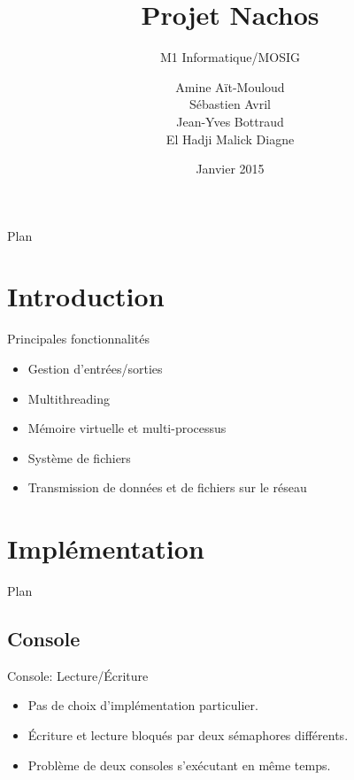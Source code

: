 \documentclass{beamer}
\title{Projet Nachos}
\subtitle{M1 Informatique/MOSIG}
\author{Amine Aït-Mouloud
\\ Sébastien Avril
\\ Jean-Yves Bottraud
\\ El Hadji Malick Diagne
}
\date{Janvier 2015}
\begin{document}

\begin{frame}{Plan}
    \tableofcontents
\end{frame}

\section{Introduction}
\begin{frame}{Principales fonctionnalités}
	\begin{itemize}
       \item Gestion d'entrées/sorties
       \item Multithreading
       \item Mémoire virtuelle et multi-processus
       \item Système de fichiers
       \item Transmission de données et de fichiers sur le réseau
   \end{itemize}
\end{frame}

\section{Implémentation}
\begin{frame}{Plan}
    \tableofcontents[currentsection]
\end{frame}

\subsection{Console}
\begin{frame}{Console: Lecture/Écriture}
   \begin{itemize}
       \item Pas de choix d'implémentation particulier.
       \item Écriture et lecture bloqués par deux sémaphores différents.
       \item Problème de deux consoles s’exécutant en même temps.
   \end{itemize}
\end{frame}
\end{document}
